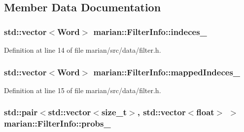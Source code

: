 \subsection{Member Data Documentation}
\subsubsection[{\texorpdfstring{indeces\+\_\+}{indeces_}}]{\setlength{\rightskip}{0pt plus 5cm}std\+::vector$<${\bf Word}$>$ marian\+::\+Filter\+Info\+::indeces\+\_\+\hspace{0.3cm}{\ttfamily [private]}}\hypertarget{classmarian_1_1FilterInfo_aa1adbd7e9344e1183b61db98c368ee66}{}\label{classmarian_1_1FilterInfo_aa1adbd7e9344e1183b61db98c368ee66}


Definition at line 14 of file marian/src/data/filter.\+h.

\subsubsection[{\texorpdfstring{mapped\+Indeces\+\_\+}{mappedIndeces_}}]{\setlength{\rightskip}{0pt plus 5cm}std\+::vector$<${\bf Word}$>$ marian\+::\+Filter\+Info\+::mapped\+Indeces\+\_\+\hspace{0.3cm}{\ttfamily [private]}}\hypertarget{classmarian_1_1FilterInfo_a231ddfb90ed57402c6f20fa4e8eb3afd}{}\label{classmarian_1_1FilterInfo_a231ddfb90ed57402c6f20fa4e8eb3afd}


Definition at line 15 of file marian/src/data/filter.\+h.

\subsubsection[{\texorpdfstring{probs\+\_\+}{probs_}}]{\setlength{\rightskip}{0pt plus 5cm}std\+::pair$<$std\+::vector$<$size\+\_\+t$>$, std\+::vector$<$float$>$ $>$ marian\+::\+Filter\+Info\+::probs\+\_\+\hspace{0.3cm}{\ttfamily [private]}}\hypertarget{classmarian_1_1FilterInfo_a1050c89fb3c2ce4eaf2928979b20288d}{}\label{classmarian_1_1FilterInfo_a1050c89fb3c2ce4eaf2928979b20288d}



